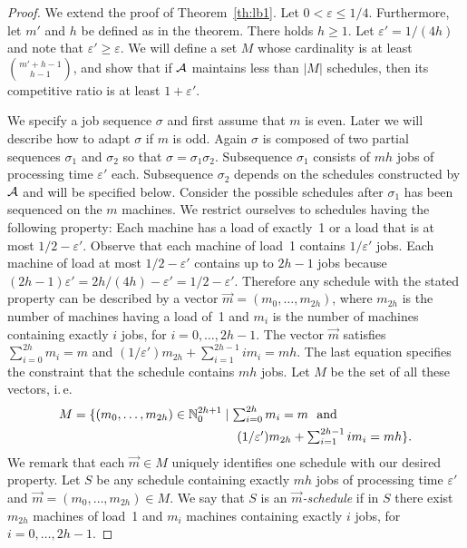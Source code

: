 \documentclass{llncs}
\newcommand{\eps}{\varepsilon}
\begin{document}
\begin{proof}
We extend the proof of Theorem~\ref{th:lb1}. Let $0<\eps \leq 1/4$. Furthermore, let $m'$ and $h$ be defined as
in the theorem. There holds $h\geq 1$. Let $\eps' = 1/(4h)$ and note that $\eps' \geq \eps$. We will define a set
$M$ whose cardinality is at least ${m'+h-1 \choose h-1}$, and show that if ${\cal A}$ maintains less than
$|M|$ schedules, then its competitive ratio is at least $1+\eps'$.

We specify a job sequence $\sigma$ and first assume that $m$ is even. Later we will describe how to adapt
$\sigma$ if $m$ is odd. Again $\sigma$ is composed of two partial sequences $\sigma_1$ and $\sigma_2$ so
that $\sigma = \sigma_1\sigma_2$. Subsequence $\sigma_1$ consists of $mh$ jobs of processing time $\eps'$ 
each. Subsequence $\sigma_2$ depends on the schedules constructed by ${\cal A}$ and will be specified below. 
Consider the possible schedules after $\sigma_1$ has been sequenced on the $m$ machines. We restrict
ourselves to schedules having the following property: Each machine has a load of exactly~1 or a load
that is at most $1/2 - \eps'$.  Observe that each machine of load~1 contains $1/\eps'$ jobs. Each machine
of load at most $1/2 - \eps'$ contains up to $2h-1$ jobs because $(2h-1)\eps' = 2h/(4h) -\eps' = 
1/2 -\eps'$. Therefore any schedule with the stated property can be described by a vector
$\vec{m} = (m_0, \ldots, m_{2h})$, where $m_{2h}$ is the number of machines having a load of~1 and
$m_i$ is the number of machines containing exactly $i$ jobs, for $i=0, \ldots, 2h-1$. The vector $\vec{m}$
satisfies $\sum_{i=0}^{2h} m_i = m $ and $(1/\eps')m_{2h} + \sum_{i=1}^{2h-1} i m_i = mh$. The last
equation specifies the constraint that the schedule contains $mh$ jobs. Let $M$ be the set of all these
vectors, i.\,e.\
\begin{eqnarray*}
\lefteqn{\textstyle{M = \{(m_0, \ldots, m_{2h}) \in \mathbb{N}_0^{2h+1}\mid  \sum_{i=0}^{2h} m_i = m \ \ \mbox{and} }}\\
& & \hspace*{4.6cm}\textstyle{(1/\eps')m_{2h} + \sum_{i=1}^{2h-1} i m_i = mh\}.}
\end{eqnarray*}
We remark that each $\vec{m}\in M$ uniquely identifies one schedule with our desired property. Let $S$ be
any schedule containing exactly $mh$ jobs of processing time $\eps'$ and $\vec{m} = (m_0, \ldots, m_{2h}) \in M$.
We say that $S$ is an {\em $\vec{m}$-schedule\/} if in $S$ there exist $m_{2h}$ machines of load~1 and 
$m_i$ machines containing exactly $i$ jobs, for $i=0, \ldots, 2h-1$. 


\end{proof}
\end{document}
